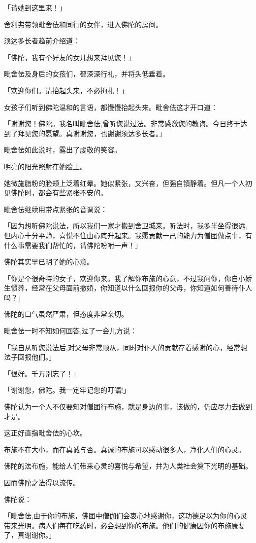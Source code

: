 \documentclass[twoside,openany]{book}
\begin{document}
「请她到这里来！」

舍利弗带领毗舍佉和同行的女伴，进入佛陀的房间。

须达多长者趋前介绍道：

「佛陀，我有个好友的女儿想来拜见您！」

毗舍佉及身后的女孩们，都深深行礼，并将头低垂着。

「欢迎你们。请抬起头来，不必拘礼！」

女孩子们听到佛陀温和的言语，都慢慢抬起头来。毗舍佉这才开口道：

「谢谢您！佛陀。我名叫毗舍佉,曾听您说过法。非常感激您的教诲。今日终于达到了拜见您的愿望。真谢谢您，也谢谢须达多长者。」

毗舍佉如此说时，露出了虔敬的笑容。

明亮的阳光照射在她脸上。

她微施脂粉的脸颊上泛着红晕。她似紧张，又兴奋，但强自镇静着。但凡一个人初见佛陀时，都会有些紧张不安的。

毗舍佉继续用带点紧张的音调说：

「因为想听佛陀说法，所以我们一家才搬到舍卫城来。听法时，我多半坐得很远,但内心十分平静，喜悦不住由心底升起来。我愿贡献一己的能力为僧团做点事，有什么事需要我们帮忙的，请佛陀吩咐一声！」

佛陀其实早已明了她的心意。

「你是个很奇特的女子，欢迎你来。我了解你布施的心意，不过我问你，你自小娇生惯养，经常在父母面前撤娇，你知道以什么回报你的父母，你知道如何善待仆人吗？」

佛陀的口气虽然严肃，但态度非常亲切。

毗舍佉一时不知如何回答,过了一会儿方说：

「我自从听您说法后,对父母非常顺从，同时对仆人的贡献存着感谢的心，经常想法子回报他们。」

「很好。千万别忘了！」

「谢谢您，佛陀。我一定牢记您的叮嘱!」

佛陀认为一个人不仅要知对僧团行布施，就是身边的事，该做的，仍应尽力去做到才是。

这正好直指毗舍佉的心坎。

布施不在大小，而在真诚与否。真诚的布施可以感动很多人，净化人们的心灵。

佛陀的法布施，能给人们带来心灵的喜悦与希望，并为人类社会奠下光明的基础。

因而佛陀之法得以流传。

佛陀说：

「毗舍佉,由于你的布施，佛团中僧伽们会衷心地感谢你，这功德足以为你的心灵带来光明。病人们每在吃药时，必会想到你的布施。他们的健康因你的布施康复了，真谢谢你。」
\end{document}
